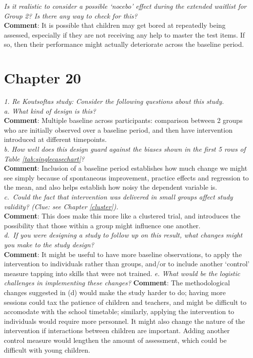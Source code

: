 \documentclass{krantz}
\begin{document}
\emph{Is it realistic to consider a possible `nocebo' effect during the extended waitlist for Group 2? Is there any way to check for this?}\\
\textbf{Comment}: It is possible that children may get bored at repeatedly being assessed, especially if they are not receiving any help to master the test items. If so, then their performance might actually deteriorate across the baseline period.

\hypertarget{chapter-20}{%
\section{Chapter 20}\label{chapter-20}}

\emph{1. Re Koutsoftas study: Consider the following questions about this study.}\\
\emph{a. What kind of design is this?}\\
\textbf{Comment}: Multiple baseline across participants: comparison between 2 groups who are initially observed over a baseline period, and then have intervention introduced at different timepoints.\\
\emph{b. How well does this design guard against the biases shown in the first 5 rows of Table \ref{tab:singlecasechart}?}\\
\textbf{Comment}: Inclusion of a baseline period establishes how much change we might see simply because of spontaneous improvement, practice effects and regression to the mean, and also helps establish how noisy the dependent variable is.\\
\emph{c.~Could the fact that intervention was delivered in small groups affect study validity? (Clue: see Chapter \ref{cluster}).}\\
\textbf{Comment}: This does make this more like a clustered trial, and introduces the possibility that those within a group might influence one another.\\
\emph{d.~If you were designing a study to follow up on this result, what changes might you make to the study design?}\\
\textbf{Comment}: It might be useful to have more baseline observations, to apply the intervention to individuals rather than groups, and/or to include another `control' measure tapping into skills that were not trained.
\emph{e. What would be the logistic challenges in implementing these changes?}
\textbf{Comment}: The methodological changes suggested in (d) would make the study harder to do; having more sessions could tax the patience of children and teachers, and might be difficult to accomodate with the school timetable; similarly, applying the intervention to individuals would require more personnel. It might also change the nature of the intervention if interactions between children are important. Adding another control measure would lengthen the amount of assessment, which could be difficult with young children.
\end{document}
